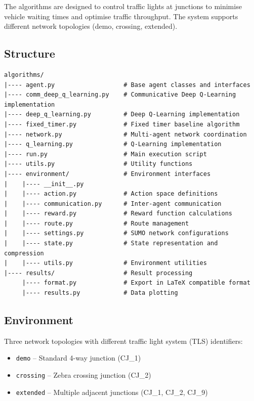\documentclass[a4paper]{report}
\begin{document}
The algorithms are designed to control traffic lights at junctions to minimise vehicle waiting times and optimise traffic throughput. The system supports different network topologies (demo, crossing, extended).

\subsection{Structure}

\begin{verbatim}
algorithms/
|---- agent.py                   # Base agent classes and interfaces
|---- comm_deep_q_learning.py    # Communicative Deep Q-Learning implementation
|---- deep_q_learning.py         # Deep Q-Learning implementation
|---- fixed_timer.py             # Fixed timer baseline algorithm
|---- network.py                 # Multi-agent network coordination
|---- q_learning.py              # Q-Learning implementation
|---- run.py                     # Main execution script
|---- utils.py                   # Utility functions
|---- environment/               # Environment interfaces
|    |---- __init__.py
|    |---- action.py             # Action space definitions
|    |---- communication.py      # Inter-agent communication
|    |---- reward.py             # Reward function calculations
|    |---- route.py              # Route management
|    |---- settings.py           # SUMO network configurations
|    |---- state.py              # State representation and compression
|    |---- utils.py              # Environment utilities
|---- results/                   # Result processing
     |---- format.py             # Export in LaTeX compatible format
     |---- results.py            # Data plotting
\end{verbatim}

\subsection{Environment}

Three network topologies with different traffic light system (TLS) identifiers:

\begin{itemize}
  \item \texttt{demo} -- Standard 4-way junction (CJ\_1)
  \item \texttt{crossing} -- Zebra crossing junction (CJ\_2)
  \item \texttt{extended} -- Multiple adjacent junctions (CJ\_1, CJ\_2, CJ\_9)
\end{itemize}
\end{document}
